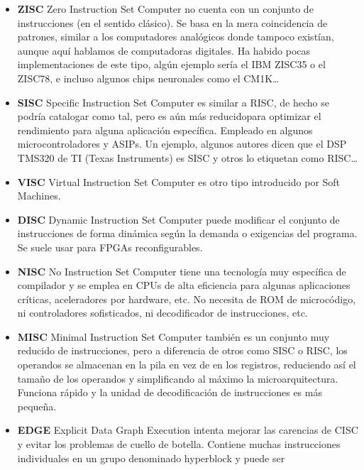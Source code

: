 \documentclass[a4paper, 11pt, titlepage]{article}
\begin{document}
            \begin{itemize}
                \item \textbf{ZISC} Zero Instruction Set Computer no cuenta con un conjunto de instrucciones (en el sentido 
                clásico). Se basa en la mera coincidencia de patrones, similar a los computadores analógicos donde tampoco 
                existían, aunque aquí hablamos de computadoras digitales. Ha habido pocas implementaciones de este tipo, algún 
                ejemplo sería el IBM ZISC35 o el ZISC78, e incluso algunos chips neuronales como el CM1K…
                \item \textbf{SISC} Specific Instruction Set Computer es similar a RISC, de hecho se podría catalogar como tal, 
                pero es aún más reducidopara optimizar el rendimiento para alguna aplicación específica. Empleado en algunos 
                microcontroladores y ASIPs. Un ejemplo, algunos autores dicen que el DSP TMS320 de TI (Texas Instruments) es 
                SISC y otros lo etiquetan como RISC…
                \item \textbf{VISC} Virtual Instruction Set Computer es otro tipo introducido por Soft Machines.
                \item \textbf{DISC} Dynamic Instruction Set Computer puede modificar el conjunto de instrucciones de forma dinámica 
                según la demanda o exigencias del programa. Se suele usar para FPGAs reconfigurables.
                \item \textbf{NISC} No Instruction Set Computer tiene una tecnología muy específica de compilador y se emplea en 
                CPUs de alta eficiencia para algunas aplicaciones críticas, aceleradores por hardware, etc. No necesita de ROM de 
                microcódigo, ni controladores sofisticados, ni decodificador de instrucciones, etc.
                \item \textbf{MISC} Minimal Instruction Set Computer también es un conjunto muy reducido de instrucciones, pero a
                diferencia de otros como SISC o RISC, los operandos se almacenan en la pila en vez de en los registros, reduciendo 
                así el tamaño de los operandos y simplificando al máximo la microarquitectura. Funciona rápido y la unidad de 
                decodificación de instrucciones es más pequeña.
                \item \textbf{EDGE} Explicit Data Graph Execution intenta mejorar las carencias de CISC y evitar los problemas de 
                cuello de botella. Contiene muchas instrucciones individuales en un grupo denominado hyperblock y puede ser 

\end{itemize}
\end{document}
